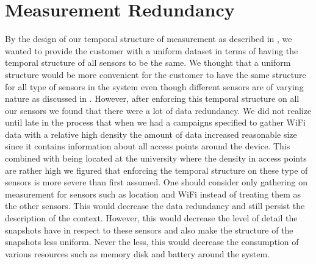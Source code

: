 
\section{Measurement Redundancy}
\label{sec:measurement_redundancy}
By the design of our temporal structure of measurement as described in , we wanted to provide the customer with a uniform dataset in terms of having the temporal structure of all sensors to be the same. We thought that a uniform structure would be more convenient for the customer to have the same structure for all type of sensors in the system even though different sensors are of varying nature as discussed in . However, after enforcing this temporal structure on all our sensors we found that there were a lot of data redundancy. We did not realize until late in the process that when we had a campaigns specified to gather WiFi data with a relative high density the amount of data increased reasonable size since it contains information about all access points around the device. This combined with being located at the university where the density in access points are rather high we figured that enforcing the temporal structure on these type of sensors is more severe than first assumed. One should consider only gathering on measurement for sensors such as location and WiFi instead of treating them as the other sensors. This would decrease the data redundancy and still persist the description of the context. However, this would decrease the level of detail the snapshots have in respect to these sensors and also make the structure of the snapshots less uniform. Never the less, this would decrease the consumption of various resources such as memory disk and battery around the system.